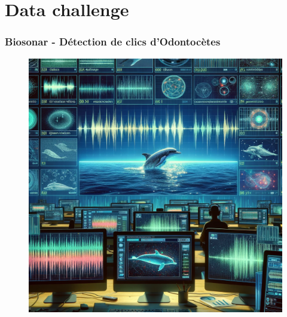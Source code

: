 \documentclass{beamer}
\theoremstyle{definition}
\begin{document}
\section{Data challenge}
\begin{frame}
	\frametitle{Biosonar - Détection de clics d’Odontocètes}
	\centering
	\begin{minipage}[c]{0.6\linewidth}\centering\begin{figure}
			
			\includegraphics[width=1\linewidth]{dauphin.png}
			\caption*{}
			
	\end{figure}\end{minipage}
\end{frame}
\end{document}
